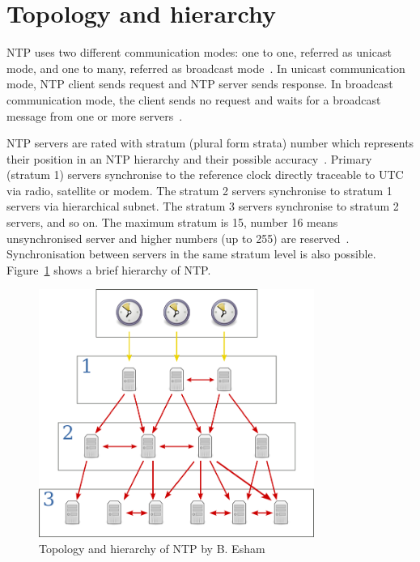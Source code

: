
\section{Topology and hierarchy}\label{sec:ntp-topology}
NTP uses two different communication modes:
one to one, referred as unicast mode, and one to many, referred as broadcast mode~\cite{rfc5905}.
In unicast communication mode, NTP client sends request and NTP server sends response.
In broadcast communication mode, the client sends no request
and waits for a broadcast message from one or more servers~\cite{rfc5905}.

NTP servers are rated with stratum (plural form strata) number which represents their position
in an NTP hierarchy and their possible accuracy~\cite{rfc5905}.
Primary (stratum 1) servers synchronise to the reference clock directly traceable to UTC via
radio, satellite or modem.
The stratum 2 servers synchronise to stratum 1
servers via hierarchical subnet.
The stratum 3 servers synchronise to stratum 2 servers, and so on.
The maximum stratum is 15, number 16 means unsynchronised server
and higher numbers (up to 255) are reserved~\cite{rfc5905}.
Synchronisation between servers in the same stratum level is also possible.
Figure~\ref{fig:ntp-hierarchy} shows a brief hierarchy of NTP.
\begin{figure}
  \centering
  \includegraphics[width=9cm,keepaspectratio]{fig/Network_Time_Protocol_servers_and_clients.pdf}
  \caption{Topology and hierarchy of NTP by B. Esham}
  \label{fig:ntp-hierarchy}
  \bigskip
\end{figure}
